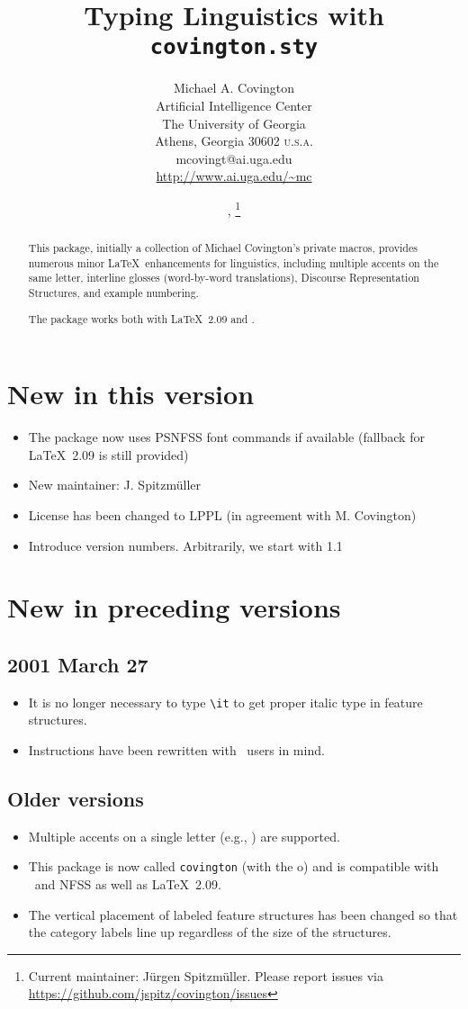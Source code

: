 \documentclass{article}
\title{\textbf{Typing Linguistics with \texttt{covington.sty}}}
\author{Michael A. Covington \\
        \small Artificial Intelligence Center \\
        \small The University of Georgia \\
        \small Athens, Georgia 30602 \textsc{u.s.a.}\\
        mcovingt@ai.uga.edu\\
        \url{http://www.ai.uga.edu/~mc}}
\date{\pversion, \pdate\thanks{Current maintainer: J\"urgen Spitzm\"uller.
      Please report issues via \protect\url{https://github.com/jspitz/covington/issues}}}
\begin{document}
\maketitle

\begin{abstract}
\noindent This package, initially a collection of Michael Covington's private macros, provides
numer­ous mi­nor \LaTeX\ en­hance­ments for lin­guis­tics, in­clud­ing mul­ti­ple ac­cents on the
same let­ter, in­ter­line glosses (word-by-word trans­la­tions), Dis­course Rep­re­sen­ta­tion
Struc­tures, and ex­am­ple num­ber­ing.

The package works both with \LaTeX\ 2.09 and \LaTeXe.
\end{abstract}

{\footnotesize \tableofcontents}

\section*{New in this version}
\begin{itemize}
\item The package now uses PSNFSS font commands if available (fallback for \LaTeX\ 2.09 is still provided)
\item New maintainer: J. Spitzm\"uller
\item License has been changed to LPPL (in agreement with M. Covington)
\item Introduce version numbers. Arbitrarily, we start with 1.1
\end{itemize}

\section*{New in preceding versions}
\subsection*{2001 March 27}
\begin{itemize}
\item It is no longer necessary to type \verb"\it" to get proper italic type in feature structures.
\item Instructions have been rewritten with \LaTeXe\ users in mind.
\end{itemize}

\subsection*{Older versions}
\begin{itemize}
\item Multiple accents on a single letter (e.g., \emph{}) are supported.
\item This package is now called \texttt{covington} (with the o)
and is compatible with \LaTeXe\ and NFSS as well as \LaTeX\ 2.09.
\item The vertical placement of labeled feature structures has 
been changed
so that the category labels line up regardless of the size of
the structures.
\end{itemize}
\end{document}
